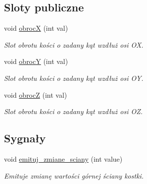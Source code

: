 \subsection*{Sloty publiczne}
\begin{DoxyCompactItemize}
\item 
void \hyperlink{class_wizualizacja_kosc_acc8ddbf71bdee742b882390c73536b83}{obrocX} (int val)
\begin{DoxyCompactList}\small\item\em Slot obrotu kości o zadany kąt wzdłuż osi OX. \end{DoxyCompactList}\item 
void \hyperlink{class_wizualizacja_kosc_a05112c1b2321cc7ce5fc4123263ede7a}{obrocY} (int val)
\begin{DoxyCompactList}\small\item\em Slot obrotu kości o zadany kąt wzdłuż osi OY. \end{DoxyCompactList}\item 
void \hyperlink{class_wizualizacja_kosc_a3da3fdf570d1b5257992ee76b612792d}{obrocZ} (int val)
\begin{DoxyCompactList}\small\item\em Slot obrotu kości o zadany kąt wzdłuż osi OZ. \end{DoxyCompactList}\end{DoxyCompactItemize}
\subsection*{Sygnały}
\begin{DoxyCompactItemize}
\item 
void \hyperlink{class_wizualizacja_kosc_a75401957f09d9e9ce273cabfc262c52e}{emituj\+\_\+zmiane\+\_\+sciany} (int value)
\begin{DoxyCompactList}\small\item\em Emituje zmianę wartości górnej ściany kostki. \end{DoxyCompactList}\end{DoxyCompactItemize}
